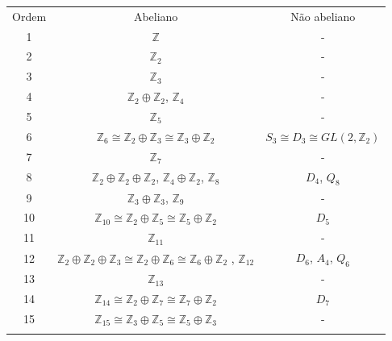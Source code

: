 \documentclass[a4paper,portuguese,11pt,twoside, leqno]{book}
\theoremstyle{definition}
\begin{document}
	\begin{center}	
		\begin{tabular}{ccc}
			Ordem & Abeliano & Não abeliano \\
			1 & $\mathbb{Z}$ & - \\
			2 & $\mathbb{Z}_2$ & - \\
			3 & $\mathbb{Z}_3$ & - \\
			4 & $\mathbb{Z}_2\oplus\mathbb{Z}_2$, $\mathbb{Z}_4$ & - \\
			5 & $\mathbb{Z}_5$ & - \\
			6 & $\mathbb{Z}_6\cong\mathbb{Z}_2\oplus\mathbb{Z}_3\cong\mathbb{Z}_3\oplus\mathbb{Z}_2$ & $S_3\cong D_3\cong GL(2,\mathbb{Z}_2)$ \\
			7 & $\mathbb{Z}_7$ & - \\
			8 & $\mathbb{Z}_2\oplus\mathbb{Z}_2\oplus\mathbb{Z}_2$, $\mathbb{Z}_4\oplus\mathbb{Z}_2$, $\mathbb{Z}_8$ & $D_4$, $Q_8$\\
			9 & $\mathbb{Z}_3\oplus\mathbb{Z}_3$, $\mathbb{Z}_9$ & - \\
			10 & $\mathbb{Z}_{10}\cong\mathbb{Z}_2\oplus\mathbb{Z}_5\cong\mathbb{Z}_5\oplus\mathbb{Z}_2$ & $D_5$ \\
			11 & $\mathbb{Z}_{11}$ & - \\
			12 & $\mathbb{Z}_2\oplus\mathbb{Z}_2\oplus\mathbb{Z}_3\cong\mathbb{Z}_2\oplus\mathbb{Z}_6\cong\mathbb{Z}_6\oplus\mathbb{Z}_2$ , $\mathbb{Z}_{12}$ & $D_6$, $A_4$, $Q_6$ \\
			13 & $\mathbb{Z}_{13}$ & - \\
			14 & $\mathbb{Z}_{14}\cong\mathbb{Z}_2\oplus\mathbb{Z}_7\cong\mathbb{Z}_7\oplus\mathbb{Z}_2$ & $D_7$ \\
			15 & $\mathbb{Z}_{15}\cong\mathbb{Z}_3\oplus\mathbb{Z}_5\cong\mathbb{Z}_5\oplus\mathbb{Z}_3$ & - \\
			\label{tabela grupos}	
		\end{tabular}%
	\end{center}
\end{document}
